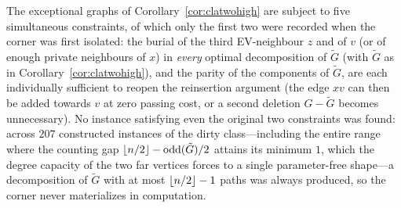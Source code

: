 \begin{remark}
The exceptional graphs of Corollary~\ref{cor:clatwohigh} are subject to
five simultaneous constraints, of which only the first two were recorded
when the corner was first isolated: the burial of the third EV-neighbour
$z$ and of $v$ (or of enough private neighbours of $x$) in \emph{every}
optimal decomposition of $\tilde G$ (with $\tilde G$ as in
Corollary~\ref{cor:clatwohigh}), and the parity of the components of
$\tilde G$, are each individually sufficient to reopen the reinsertion
argument (the edge $xv$ can then be added towards $v$ at zero passing
cost, or a second deletion $G-\tilde G$ becomes unnecessary). No instance
satisfying even the original two constraints was found: across $207$
constructed instances of the dirty class---including the entire range
where the counting gap $\left\lfloor n/2 \right\rfloor-\mathrm{odd}(\tilde G)/2$ attains its
minimum $1$, which the degree capacity of the two far vertices forces to a
single parameter-free shape---a decomposition of $\tilde G$ with at most
$\left\lfloor n/2 \right\rfloor-1$ paths was always produced, so the corner never materializes
in computation.


\end{remark}
